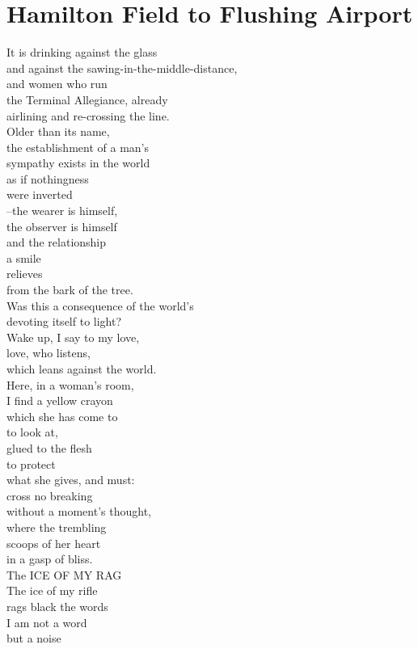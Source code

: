 \documentclass[smalldemyvopaper,11pt,twoside,onecolumn,openright,extrafontsizes]{memoir}
\begin{document}
\chapter{Hamilton Field to Flushing Airport}
It is drinking against the glass
\\and against the sawing-in-the-middle-distance,
\\and women who run
\\the Terminal Allegiance, already
\\airlining and re-crossing the line.
\\Older than its name,
\\the establishment of a man's
\\sympathy exists in the world
\\as if nothingness
\\were inverted
\\--the wearer is himself,
\\the observer is himself
\\and the relationship
\\a smile
\\relieves
\\from the bark of the tree.
\\Was this a consequence of the world's
\\devoting itself to light?
\\Wake up, I say to my love,
\\love, who listens,
\\which leans against the world.
\\Here, in a woman's room,
\\I find a yellow crayon
\\which she has come to
\\to look at,
\\glued to the flesh
\\to protect
\\what she gives, and must:
\\cross no breaking
\\without a moment's thought,
\\where the trembling
\\scoops of her heart
\\in a gasp of bliss.
\\The ICE OF MY RAG
\\The ice of my rifle
\\rags black the words
\\I am not a word
\\but a noise
\end{document}
